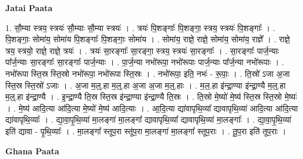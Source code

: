 \documentclass[17pt]{extarticle}
\begin{document}
\textbf{Jatai Paata} \newline

1. सौ॒म्या स्त्रय॒ स्त्रयः॑ सौ॒म्याः सौ॒म्या स्त्रयः॑ । . त्रयः॑ पि॒शङ्गाः᳚ पि॒शङ्गा॒ स्त्रय॒ स्त्रयः॑ पि॒शङ्गाः᳚ । . पि॒शङ्गाः॒ सोमा॑य॒ सोमा॑य पि॒शङ्गाः᳚ पि॒शङ्गाः॒ सोमा॑य । . सोमा॑य॒ राज्ञे॒ राज्ञे॒ सोमा॑य॒ सोमा॑य॒ राज्ञे᳚ । . राज्ञे॒ त्रय॒ स्त्रयो॒ राज्ञे॒ राज्ञे॒ त्रयः॑ । . त्रयः॑ सा॒रङ्गाः᳚ सा॒रङ्गा॒ स्त्रय॒ स्त्रयः॑ सा॒रङ्गाः᳚ । . सा॒रङ्गाः᳚ पार्ज॒न्याः पा᳚र्ज॒न्याः सा॒रङ्गाः᳚ सा॒रङ्गाः᳚ पार्ज॒न्याः । . पा॒र्ज॒न्या नभो॑रूपा॒ नभो॑रूपाः पार्ज॒न्याः पा᳚र्ज॒न्या नभो॑रूपाः । . नभो॑रूपा स्ति॒स्र स्ति॒स्रो नभो॑रूपा॒ नभो॑रूपा स्ति॒स्रः । . नभो॑रूपा॒ इति॒ नभः॑ - रू॒पाः॒ । . ति॒स्रो॑ ऽजा अ॒जा स्ति॒स्र स्ति॒स्रो॑ ऽजाः । . अ॒जा म॒ल्॒.हा म॒ल्॒.हा अ॒जा अ॒जा म॒ल्॒.हाः । . म॒ल॒.हा इ॑न्द्रा॒ण्या इ॑न्द्रा॒ण्यै म॒ल्॒.हा म॒ल्॒.हा इ॑न्द्रा॒ण्यै । . इ॒न्द्रा॒ण्यै ति॒स्र स्ति॒स्र इ॑न्द्रा॒ण्या इ॑न्द्रा॒ण्यै ति॒स्रः । . ति॒स्रो मे॒ष्यो॑ मे॒ष्य॑ स्ति॒स्र स्ति॒स्रो मे॒ष्यः॑ । . मे॒ष्य॑ आदि॒त्या आ॑दि॒त्या मे॒ष्यो॑ मे॒ष्य॑ आदि॒त्याः । . आ॒दि॒त्या द्या॑वापृथि॒व्या᳚ द्यावापृथि॒व्या॑ आदि॒त्या आ॑दि॒त्या द्या॑वापृथि॒व्याः᳚ । . द्या॒वा॒पृ॒थि॒व्या॑ मा॒लङ्गा॑ मा॒लङ्गा᳚ द्यावापृथि॒व्या᳚ द्यावापृथि॒व्या॑ मा॒लङ्गाः᳚ । . द्या॒वा॒पृ॒थि॒व्या॑ इति॑ द्यावा - पृ॒थि॒व्याः᳚ । . मा॒लङ्गा᳚ स्तूप॒रा स्तू॑प॒रा मा॒लङ्गा॑ मा॒लङ्गा᳚ स्तूप॒राः । . तू॒प॒रा इति॑ तूप॒राः । \newline

\textbf{Ghana Paata } \newline
\end{document}
